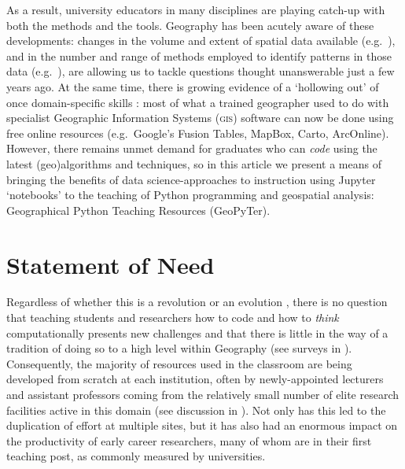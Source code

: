 \documentclass[letter, 11pt,titlepage]{article}
\newcommand{\eg}{e.g.~\/}
\begin{document}
As a result, university educators in many disciplines are playing catch-up with both the methods and the tools. Geography has been acutely aware of these developments: changes in the volume and extent of spatial data available (\eg \citealp{Graham2013,gonzalez2013big,reades2016}), and in the number and range of methods employed to identify patterns in those data (\eg \citealp{Fan2016,Naik2017,Santibanez2015,Stevens2015,ArribasBel2017}), are allowing us to tackle questions thought unanswerable just a few years ago. At the same time, there is growing evidence of a `hollowing out' of once domain-specific skills \citep{Singleton2014,Singleton2016}: most of what a trained geographer used to do with specialist Geographic Information Systems (\textsc{gis}) software can now be done using free online resources (\eg Google's Fusion Tables, MapBox, Carto, ArcOnline). However, there remains unmet demand for graduates who can \emph{code} using the latest (geo)algorithms and techniques, so in this article we present a means of bringing the benefits of data science-approaches to instruction using Jupyter `notebooks' to the teaching of Python programming and geospatial analysis: Geographical Python Teaching Resources (GeoPyTer).

\section{Statement of Need}

Regardless of whether this is a revolution \citep{Wyly2014,Torrens2010} or an evolution \citep{Barnes2013,Barnes2014,ArribasBel2018}, there is no question that teaching students and researchers how to code and how to \textit{think} computationally presents new challenges \citep{Etherington2016,Muller2014,rey_09jgs} and that there is little in the way of a tradition of doing so to a high level within Geography (see surveys in \citealp{Bowlick2017,Bowlick2018}). Consequently, the majority of resources used in the classroom are being developed from scratch at each institution, often by newly-appointed lecturers and assistant professors coming from the relatively small number of elite research facilities active in this domain (see discussion in \citealp{esrc2013}). Not only has this led to the duplication of effort at multiple sites, but it has also had an enormous impact on the productivity of early career researchers, many of whom are in their first teaching post, as commonly measured by universities.
\end{document}
